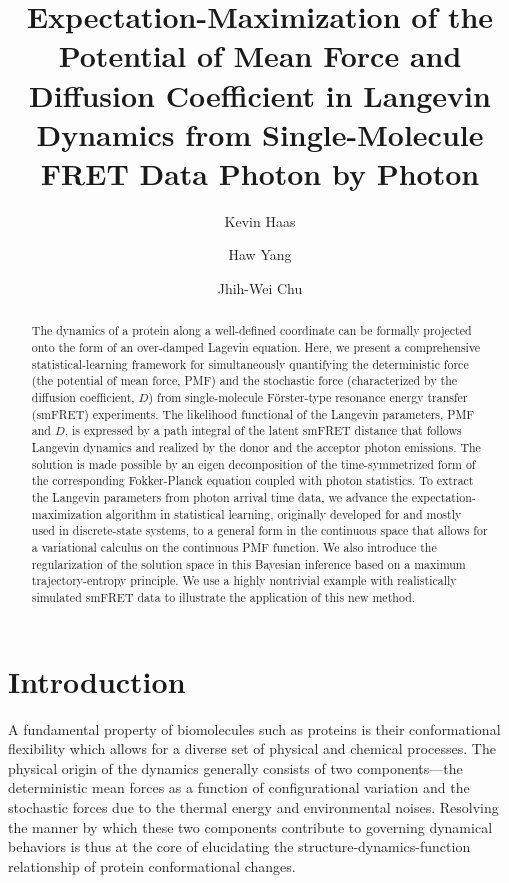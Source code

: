 \documentclass[journal=jpcbfk,manuscript=article,layout=twocolumn,articletitle=true]{achemso}
\author{Kevin Haas}
\affiliation{University of California-Berkeley, Department of Chemical and Biomolecular Engineering, Berkeley, CA 94720}
\author{Haw Yang}
\affiliation{Princeton University, Department of Chemistry, Princeton, NJ 08544}
\author{Jhih-Wei Chu}
\affiliation{University of California-Berkeley, Department of Chemical and Biomolecular Engineering, Berkeley, CA 94720}
\title[Statistical Learning Theory for smFRET]
{Expectation-Maximization of the Potential of Mean Force and Diffusion Coefficient in Langevin Dynamics from Single-Molecule FRET Data Photon by Photon}
\begin{document}

\begin{abstract}
The dynamics of a protein along a well-defined coordinate can be formally projected onto the form of an over-damped Lagevin equation. Here, we present a comprehensive statistical-learning framework for simultaneously quantifying the deterministic force (the potential of mean force, PMF) and the stochastic force (characterized by the diffusion coefficient, $D$) from single-molecule F\"{o}rster-type resonance energy transfer (smFRET) experiments. The likelihood functional of the Langevin parameters, PMF and $D$, is expressed by a path integral of the latent smFRET distance that follows Langevin dynamics and realized by the donor and the acceptor photon emissions. The solution is made possible by an eigen decomposition of the time-symmetrized form of the corresponding Fokker-Planck equation coupled with photon statistics. To extract the Langevin parameters from photon arrival time data, we advance the expectation-maximization algorithm in statistical learning, originally developed for and mostly used in discrete-state systems, to a general form in the continuous space that allows for a variational calculus on the continuous PMF function. We also introduce the regularization of the solution space in this Bayesian inference based on a maximum trajectory-entropy principle. We use a highly nontrivial example with realistically simulated smFRET data to illustrate the application of this new method.
\end{abstract}

\section{Introduction}

A fundamental property of biomolecules such as proteins is their conformational flexibility which allows for a diverse set of physical and chemical processes. The physical origin of the dynamics generally consists of two components---the deterministic mean forces as a function of configurational variation and the stochastic forces due to the thermal energy and environmental noises. Resolving the manner by which these two components contribute to governing dynamical behaviors is thus at the core of elucidating the structure-dynamics-function relationship of protein conformational changes. 
\end{document}
